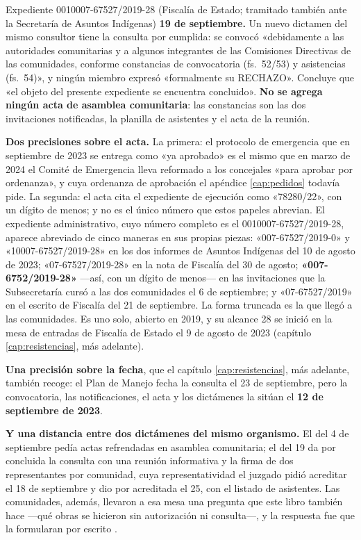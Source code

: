 \begin{ficha}{Expediente 0010007-67527/2019-28 (Fiscalía de Estado; tramitado también ante la Secretaría de Asuntos Indígenas)}
\textbf{19 de septiembre.} Un nuevo dictamen del mismo consultor tiene la consulta por cumplida: se convocó «debidamente a las autoridades comunitarias y a algunos integrantes de las Comisiones Directivas de las comunidades, conforme constancias de convocatoria (fs.\ 52/53) y asistencias (fs.\ 54)», y ningún miembro expresó «formalmente su RECHAZO». Concluye que «el objeto del presente expediente se encuentra concluido». \textbf{No se agrega ningún acta de asamblea comunitaria}: las constancias son las dos invitaciones notificadas, la planilla de asistentes y el acta de la reunión.
\end{ficha}

\begin{cautela}
\textbf{Dos precisiones sobre el acta.} La primera: el protocolo de emergencia que en septiembre de 2023 se entrega como «ya aprobado» es el mismo que en marzo de 2024 el Comité de Emergencia lleva reformado a los concejales «para aprobar por ordenanza», y cuya ordenanza de aprobación el apéndice \ref{cap:pedidos} todavía pide. La segunda: el acta cita el expediente de ejecución como «78280/22», con un dígito de menos; y no es el único número que estos papeles abrevian. El expediente administrativo, cuyo número completo es el 0010007-67527/2019-28, aparece abreviado de cinco maneras en sus propias piezas: «007-67527/2019-0» y «10007-67527/2019-28» en los dos informes de Asuntos Indígenas del 10 de agosto de 2023; «07-67527/2019-28» en la nota de Fiscalía del 30 de agosto; \textbf{«007-6752/2019-28»} ---así, con un dígito de menos--- en las invitaciones que la Subsecretaría cursó a las dos comunidades el 6 de septiembre; y «07-67527/2019» en el escrito de Fiscalía del 21 de septiembre. La forma truncada es la que llegó a las comunidades. Es uno solo, abierto en 2019, y su alcance 28 se inició en la mesa de entradas de Fiscalía de Estado el 9 de agosto de 2023 (capítulo \ref{cap:resistencias}, más adelante).

\textbf{Una precisión sobre la fecha}, que el capítulo \ref{cap:resistencias}, más adelante, también recoge: el Plan de Manejo fecha la consulta el 23 de septiembre, pero la convocatoria, las notificaciones, el acta y los dictámenes la sitúan el \textbf{12 de septiembre de 2023}.

\textbf{Y una distancia entre dos dictámenes del mismo organismo.} El del 4 de septiembre pedía actas refrendadas en asamblea comunitaria; el del 19 da por concluida la consulta con una reunión informativa y la firma de dos representantes por comunidad, cuya representatividad el juzgado pidió acreditar el 18 de septiembre y dio por acreditada el 25, con el listado de asistentes. Las comunidades, además, llevaron a esa mesa una pregunta que este libro también hace ---qué obras se hicieron sin autorización ni consulta---, y la respuesta fue que la formularan por escrito .
\end{cautela}

